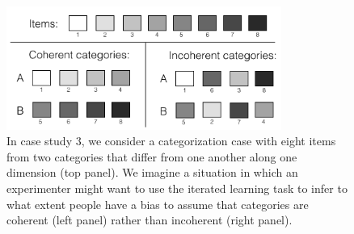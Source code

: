 \documentclass[doc]{apa6}
\begin{document}
\begin{figure}[t]
\begin{center}
\includegraphics[width=9cm]{categorisation.png} %
\caption{{\small In case study 3, we consider a categorization case with eight items from two categories that differ from one another along one dimension (top panel). We imagine a situation in which an experimenter might want to use the iterated learning task to infer to what extent people have a bias to assume that categories are coherent (left panel) rather than incoherent (right panel).}}
\label{categories}
\end{center}
\end{figure}
\end{document}
